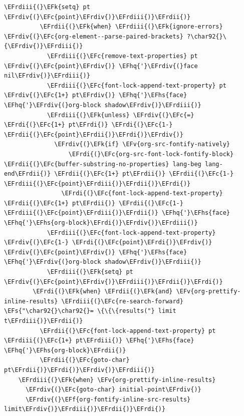 \documentclass{scrartcl}
\newcommand{\EFk}[1]{\textcolor{EFk}{#1}} %
\newcommand{\EFs}[1]{\textcolor{EFs}{#1}} %
\newcommand{\EFc}[1]{\textcolor{EFc}{#1}} %
\newcommand{\EFv}[1]{\textcolor{EFv}{#1}} %
\newcommand{\EFf}[1]{\textcolor{EFf}{#1}} %
\newcommand{\EFhq}[1]{#1} %
\newcommand{\EFhs}[1]{#1} %
\newcommand{\EFrdi}[1]{#1} %
\newcommand{\EFrdii}[1]{#1} %
\newcommand{\EFrdiii}[1]{#1} %
\newcommand{\EFrdiv}[1]{#1} %
\begin{document}
\begin{Code}
\begin{Verbatim}[]
            \EFrdiii{(}\EFk{setq} pt \EFrdiv{(}\EFc{point}\EFrdiv{)}\EFrdiii{)}\EFrdii{)}
          \EFrdii{(}\EFk{when} \EFrdiii{(}\EFk{ignore-errors} \EFrdiv{(}\EFc{org-element--parse-paired-brackets} ?\char92{}\{\EFrdiv{)}\EFrdiii{)}
            \EFrdiii{(}\EFc{remove-text-properties} pt \EFrdiv{(}\EFc{point}\EFrdiv{)} \EFhq{'}\EFrdiv{(}face nil\EFrdiv{)}\EFrdiii{)}
            \EFrdiii{(}\EFc{font-lock-append-text-property} pt \EFrdiv{(}\EFc{1+} pt\EFrdiv{)} \EFhq{'}\EFhs{face} \EFhq{'}\EFrdiv{(}org-block shadow\EFrdiv{)}\EFrdiii{)}
            \EFrdiii{(}\EFk{unless} \EFrdiv{(}\EFc{=} \EFrdi{(}\EFc{1+} pt\EFrdi{)} \EFrdi{(}\EFc{1-} \EFrdii{(}\EFc{point}\EFrdii{)}\EFrdi{)}\EFrdiv{)}
              \EFrdiv{(}\EFk{if} \EFv{org-src-fontify-natively}
                  \EFrdi{(}\EFc{org-src-font-lock-fontify-block} \EFrdii{(}\EFc{buffer-substring-no-properties} lang-beg lang-end\EFrdii{)} \EFrdii{(}\EFc{1+} pt\EFrdii{)} \EFrdii{(}\EFc{1-} \EFrdiii{(}\EFc{point}\EFrdiii{)}\EFrdii{)}\EFrdi{)}
                \EFrdi{(}\EFc{font-lock-append-text-property} \EFrdii{(}\EFc{1+} pt\EFrdii{)} \EFrdii{(}\EFc{1-} \EFrdiii{(}\EFc{point}\EFrdiii{)}\EFrdii{)} \EFhq{'}\EFhs{face} \EFhq{'}\EFhs{org-block}\EFrdi{)}\EFrdiv{)}\EFrdiii{)}
            \EFrdiii{(}\EFc{font-lock-append-text-property} \EFrdiv{(}\EFc{1-} \EFrdi{(}\EFc{point}\EFrdi{)}\EFrdiv{)} \EFrdiv{(}\EFc{point}\EFrdiv{)} \EFhq{'}\EFhs{face} \EFhq{'}\EFrdiv{(}org-block shadow\EFrdiv{)}\EFrdiii{)}
            \EFrdiii{(}\EFk{setq} pt \EFrdiv{(}\EFc{point}\EFrdiv{)}\EFrdiii{)}\EFrdii{)}\EFrdi{)}
        \EFrdi{(}\EFk{when} \EFrdii{(}\EFk{and} \EFv{org-prettify-inline-results} \EFrdiii{(}\EFc{re-search-forward} \EFs{"\char92{}\char92{}= \{\{\{results("} limit t\EFrdiii{)}\EFrdii{)}
          \EFrdii{(}\EFc{font-lock-append-text-property} pt \EFrdiii{(}\EFc{1+} pt\EFrdiii{)} \EFhq{'}\EFhs{face} \EFhq{'}\EFhs{org-block}\EFrdii{)}
          \EFrdii{(}\EFc{goto-char} pt\EFrdii{)}\EFrdi{)}\EFrdiv{)}\EFrdiii{)}
    \EFrdiii{(}\EFk{when} \EFv{org-prettify-inline-results}
      \EFrdiv{(}\EFc{goto-char} initial-point\EFrdiv{)}
      \EFrdiv{(}\EFf{org-fontify-inline-src-results} limit\EFrdiv{)}\EFrdiii{)}\EFrdii{)}\EFrdi{)}


\end{Verbatim}
\end{Code}
\end{document}
